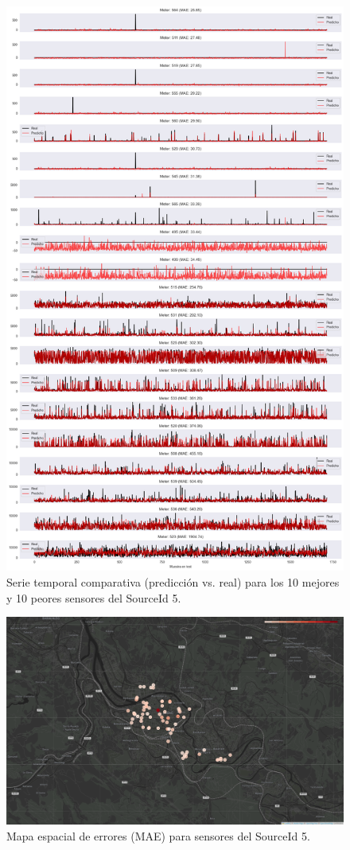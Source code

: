 \begin{figure}[H]
	\centering
	\includegraphics[width=0.75\linewidth]{includes/cap5/graphs/advanced/sid5_10best_10worst_meter_time_series.png}
	\caption{Serie temporal comparativa (predicción vs. real) para los 10 mejores y 10 peores sensores del SourceId 5.}
	\label{fig:sid5_timeseries_best_worst}
\end{figure}

\begin{figure}[H]
	\centering
	\includegraphics[width=0.9\linewidth]{includes/cap5/graphs/advanced/sid5_meters_error_rate_map.png}
	\caption{Mapa espacial de errores (MAE) para sensores del SourceId 5.}
	\label{fig:sid5_error_map}
\end{figure}


